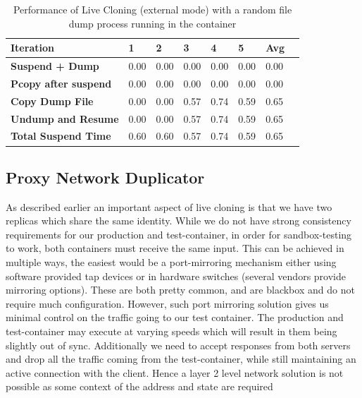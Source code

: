 \begin{table}[t]
  \centering
    \begin{tabular}{ | p{2.2cm} | l | l | l | l | l | l | l |}
    \hline
    \textbf{Iteration} & \textbf{1} & \textbf{2} & \textbf{3} & \textbf{4} & \textbf{5} & \textbf{Avg} \\ \hline
    \textbf{Suspend + Dump} & 0.00 & 0.00 & 0.00 & 0.00 & 0.00 & 0.00\\ \hline
    \textbf{Pcopy after suspend} & 0.00 & 0.00 & 0.00 & 0.00 & 0.00 & 0.00\\ \hline
    \textbf{Copy Dump File} & 0.00 & 0.00 & 0.57 & 0.74 & 0.59 & 0.65\\ \hline
    \textbf{Undump and Resume} & 0.00 & 0.00 & 0.57 & 0.74 & 0.59 & 0.65\\ \hline
    \textbf{Total Suspend Time} & 0.60 & 0.60 & 0.57 & 0.74 & 0.59 & 0.65\\ \hline
    \end{tabular}
\caption{Performance of Live Cloning (external mode) with a random file dump process running in the container}
\label{table:clonePerf}
\end{table}

\subsection{Proxy Network Duplicator} 
\label{sec:proxyDuplicator}

As described earlier an important aspect of live cloning is that we have two replicas which share the same identity. 
While we do not have strong consistency requirements for our production and test-container, in order for sandbox-testing to work, both containers must receive the same input.
This can be achieved in multiple ways, the easiest would be a port-mirroring mechanism either using software provided tap devices or in hardware switches (several vendors provide mirroring options). 
These are both pretty common, and are blackbox and do not require much configuration.
However, such port mirroring solution gives us minimal control on the traffic going to our test container.
The production and test-container may execute at varying speeds which will result in them being slightly out of sync.
Additionally we need to accept responses from both servers and drop all the traffic coming from the test-container, while still maintaining an active connection with the client.
Hence a layer 2 level network solution is not possible as some context of the address and state are required

